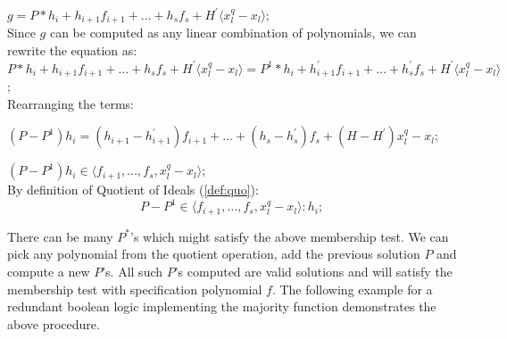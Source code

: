 $g = P*h_i+h_{i+1}f_{i+1}+\dots+h_sf_s+H^{'}\langle x_l^q-x_l\rangle;$\\
Since $g$ can be computed as any linear combination of polynomials, we can rewrite the equation as:\\
$P*h_i+h_{i+1}f_{i+1}+\dots+h_sf_s+H^{'}\langle x_l^q-x_l\rangle = P^{1}*h_i+h_{i+1}^{'}f_{i+1}+\dots+h_s^{'}f_s+H^{'}\langle x_l^q-x_l\rangle$;\\
Rearranging the terms:

$(P-P^{1})h_i = (h_{i+1}-h_{i+1}^{'})f_{i+1}+\dots+(h_{s}-h_{s}^{'})f_s+(H-H^{'})x_l^q-x_l;$

$(P-P^{1})h_i \in \langle f_{i+1},\dots,f_s,x_l^q-x_l\rangle;$\\
By definition of Quotient of Ideals (\autoref{def:quo}):
\vspace{0.1in}
\begin{equation}
\label{quotcomp}
P-P^{1} \in \langle f_{i+1},\dots,f_s,x_l^q-x_l\rangle:h_i;
\end{equation}

There can be many $P^{*}$'s which might satisfy the above membership test. We can pick any polynomial from the quotient operation, add the previous solution $P$ and compute a new $P$'s. All such $P$'s computed are valid solutions and will satisfy the membership test with specification polynomial $f$. The following example for a redundant boolean logic implementing the majority function demonstrates the above procedure.

